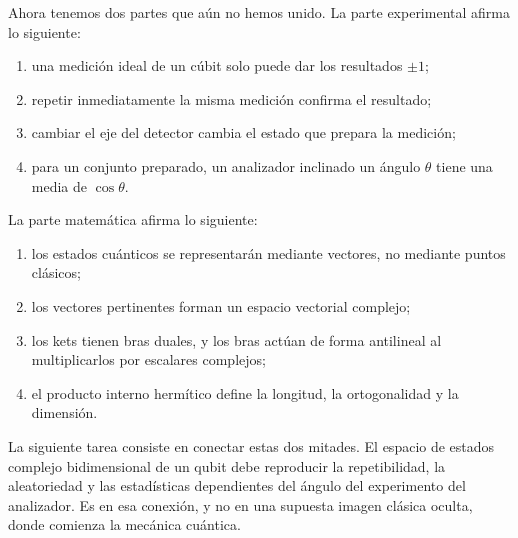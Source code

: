 Ahora tenemos dos partes que aún no hemos unido. La parte experimental afirma lo siguiente:
\begin{enumerate}
  \item una medición ideal de un cúbit solo puede dar los resultados \(\pm1\);
  \item repetir inmediatamente la misma medición confirma el resultado;
  \item cambiar el eje del detector cambia el estado que prepara la medición;
  \item para un conjunto preparado, un analizador inclinado un ángulo \(\theta\) tiene una media de \(\cos\theta\).
\end{enumerate}
La parte matemática afirma lo siguiente:
\begin{enumerate}
  \item los estados cuánticos se representarán mediante vectores, no mediante puntos clásicos;
  \item los vectores pertinentes forman un espacio vectorial complejo;
  \item los kets tienen bras duales, y los bras actúan de forma antilineal al multiplicarlos por escalares complejos;
  \item el producto interno hermítico define la longitud, la ortogonalidad y la dimensión.
\end{enumerate}

La siguiente tarea consiste en conectar estas dos mitades. El espacio de estados complejo bidimensional de un qubit debe reproducir la repetibilidad, la aleatoriedad y las estadísticas dependientes del ángulo del experimento del analizador. Es en esa conexión, y no en una supuesta imagen clásica oculta, donde comienza la mecánica cuántica.
